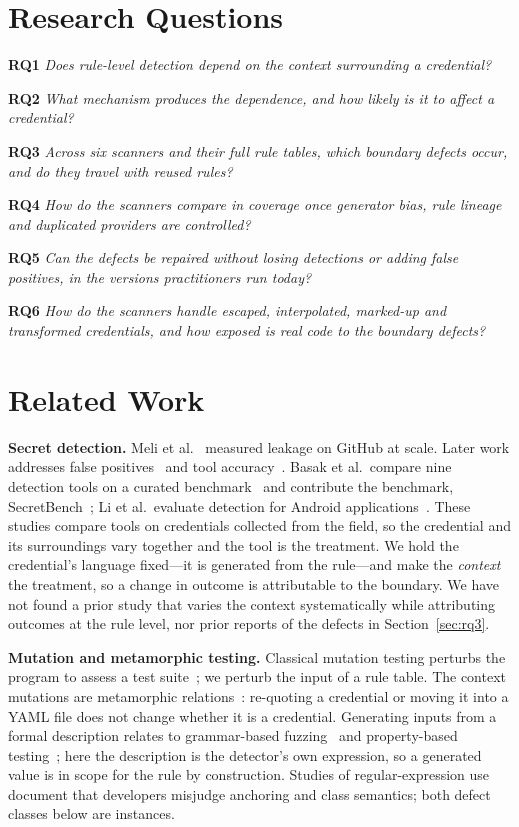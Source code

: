 \documentclass[10pt,journal,compsoc]{IEEEtran}
\newcommand{\RQ}[1]{\textbf{RQ#1}}
\begin{document}
\section{Research Questions}
\label{sec:rqs}

\noindent\RQ{1} \emph{Does rule-level detection depend on the context surrounding a credential?}

\noindent\RQ{2} \emph{What mechanism produces the dependence, and how likely is it to affect a credential?}

\noindent\RQ{3} \emph{Across six scanners and their full rule tables, which boundary defects occur, and do they travel with reused rules?}

\noindent\RQ{4} \emph{How do the scanners compare in coverage once generator bias, rule lineage and duplicated providers are controlled?}

\noindent\RQ{5} \emph{Can the defects be repaired without losing detections or adding false positives, in the versions practitioners run today?}

\noindent\RQ{6} \emph{How do the scanners handle escaped, interpolated, marked-up and transformed credentials, and how exposed is real code to the boundary defects?}

\section{Related Work}
\label{sec:related}

\textbf{Secret detection.} Meli et al.~\cite{meli2019} measured leakage on GitHub at scale. Later work addresses false positives~\cite{saha2020,rahman2019} and tool accuracy~\cite{basak2022}. Basak et al.\ compare nine detection tools on a curated benchmark~\cite{basak2023comparative} and contribute the benchmark, SecretBench~\cite{basak2023secretbench}; Li et al.\ evaluate detection for Android applications~\cite{li2025android}. These studies compare tools on credentials collected from the field, so the credential and its surroundings vary together and the tool is the treatment. We hold the credential's language fixed---it is generated from the rule---and make the \emph{context} the treatment, so a change in outcome is attributable to the boundary. We have not found a prior study that varies the context systematically while attributing outcomes at the rule level, nor prior reports of the defects in Section~\ref{sec:rq3}.

\textbf{Mutation and metamorphic testing.} Classical mutation testing perturbs the program to assess a test suite~\cite{jia2011,demillo1978}; we perturb the input of a rule table. The context mutations are metamorphic relations~\cite{chen2018metamorphic,segura2016}: re-quoting a credential or moving it into a YAML file does not change whether it is a credential. Generating inputs from a formal description relates to grammar-based fuzzing~\cite{godefroid2008} and property-based testing~\cite{claessen2000}; here the description is the detector's own expression, so a generated value is in scope for the rule by construction. Studies of regular-expression use~\cite{chapman2016,michael2019} document that developers misjudge anchoring and class semantics; both defect classes below are instances.
\end{document}
